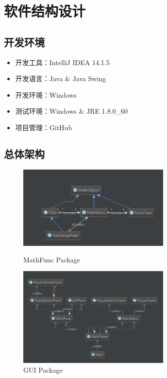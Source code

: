 \documentclass[hyperref, UTF8
,bookmarksnumbered=true, oneside]{ctexbook}
\begin{document}

\chapter{软件结构设计}

	\section{开发环境} %
	\label{sec:}
		\begin{itemize}
			\item 开发工具：IntelliJ IDEA 14.1.5
			\item 开发语言：Java \& Java Swing
			\item 开发环境：Windows
			\item 测试环境：Windows \& JRE 1.8.0\_60
			\item 项目管理：GitHub
		\end{itemize}
	
	\section{总体架构} %
		

		\begin{figure}[!h]
			\begin{minipage}[b]{0.45\textwidth}
			\centering
			\includegraphics[width=3in]{MathPack.png}
			\caption{MathFunc Package}
			\label{pic:MathPack}
			\end{minipage}%
			\hspace{0.1\textwidth}%
			\begin{minipage}[b]{0.45\textwidth}
			\centering
			\includegraphics[width=3in]{GUIPack.png}
			\caption{GUI Package}
			\label{pic:GUIPack}
			\end{minipage}
		\end{figure}
\end{document}
